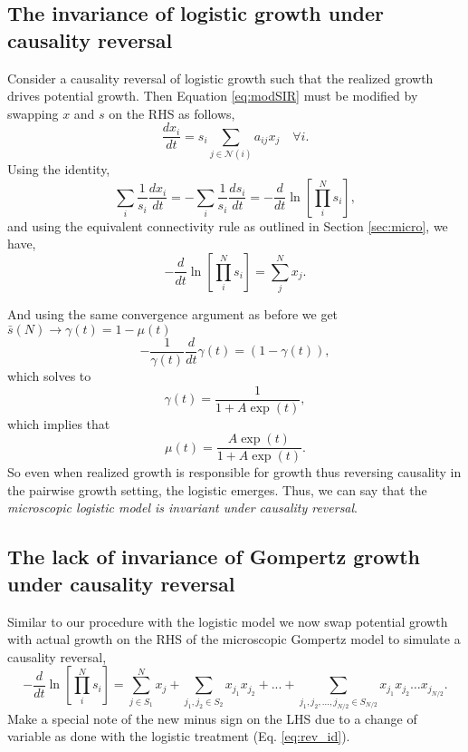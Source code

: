 \documentclass{article}
\begin{document}
\subsection{The invariance of logistic growth under causality reversal}
\label{appendix:swappinglogistic}
Consider a causality reversal of logistic growth such that the realized growth drives potential growth. Then Equation \ref{eq:modSIR} must be modified by swapping $x$ and $s$ on the RHS as follows,
\begin{equation}
\label{eq:revSIR}
\frac{d x_i}{dt} = s_i\sum_{j \in \mathcal{N}(i)}{a_{ij}}x_{j} \quad \forall i.
\end{equation}
Using the identity,
\begin{equation}
\label{eq:modSIR2app}
\sum_i\frac{1}{s_i}\frac{dx_i}{dt} = -\sum_i\frac{1}{s_i}\frac{ds_i}{dt} = -\frac{d}{dt} \ln \left[ \prod_i^N s_i \right ],
\end{equation}
and using the equivalent connectivity rule as outlined in Section \ref{sec:micro}, we have,
\begin{equation}
\label{eq:rev_id}
-\frac{d}{dt} \ln \left[ \prod_i^N s_i \right ] = \sum_j^N x_j.
\end{equation}

And using the same convergence argument as before we get $\bar{s}(N) \rightarrow \gamma(t) = 1 - \mu(t)$
\begin{equation}
  -\frac{1}{\gamma(t)}\frac{d}{dt}\gamma(t) = (1-\gamma(t)),
\end{equation}
which solves to 
\begin{equation}
  \gamma(t) = \frac{1}{1 + A \exp(t)},
\end{equation}
which implies that
\begin{equation}
  \mu(t) = \frac{A \exp(t)}{1 + A \exp(t)}.
\end{equation}
So even when realized growth is responsible for growth thus reversing causality in the pairwise growth setting, the logistic emerges. Thus, we can say that the \textit{microscopic logistic model is invariant under causality reversal}.

\subsection{The lack of invariance of Gompertz growth under causality reversal}
\label{appendix:swappinggompertz}
Similar to our procedure with the logistic model we now swap potential growth with actual growth on the RHS of the microscopic Gompertz model to simulate a causality reversal,
\begin{equation}
\label{eq:MicroGompRev}
-\frac{d}{dt} \ln \left[ \prod_i^N s_i \right ] = \sum_{j\in S_1}^N x_{j} + \sum_{j_1, j_2 \in S_2} x_{j_1}x_{j_2} + ... + \sum_{j_1, j_2, ..., j_{N/2} \in S_{N/2}} x_{j_1}x_{j_2}\dots x_{j_{N/2}}.
\end{equation}
Make a special note of the new minus sign on the LHS due to a change of variable as done with the logistic treatment (Eq. \ref{eq:rev_id}).
\end{document}
